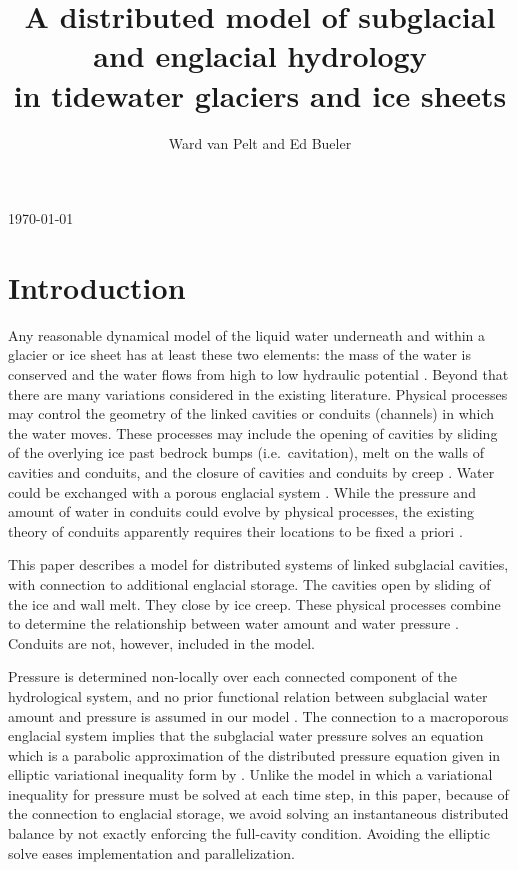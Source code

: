 \documentclass[11pt,final]{amsart}%
\title[]{A distributed model of subglacial and englacial hydrology \\ in tidewater glaciers and ice sheets}
\author[]{Ward van Pelt and Ed Bueler}
\begin{document}
\graphicspath{{figs/}}

\scriptsize \hfill \today \normalsize
\vspace{0.5in}

\maketitle
\thispagestyle{empty}

\section{Introduction}

Any reasonable dynamical model of the liquid water underneath and within a glacier or ice sheet has at least these two elements: the mass of the water is conserved and the water flows from high to low hydraulic potential \citep{Clarke05}.  Beyond that there are many variations considered in the existing literature.  Physical processes may control the geometry of the linked cavities \citep{Kamb1987} or conduits (channels) \citep{Nye1976} in which the water moves.  These processes may include the opening of cavities by sliding of the overlying ice past bedrock bumps (i.e.~cavitation), melt on the walls of cavities and conduits, and the closure of cavities and conduits by creep \citep{Hewitt2011}.  Water could be exchanged with a porous englacial system \citep{Bartholomausetal2011}.  While the pressure and amount of water in conduits could evolve by physical processes, the existing theory of conduits apparently requires their locations to be fixed a priori \citep{PimentelFlowers2011,Schoofmeltsupply}.

This paper describes a model for distributed systems of linked subglacial cavities, with connection to additional englacial storage.  The cavities open by sliding of the ice and wall melt.  They close by ice creep.  These physical processes combine to determine the relationship between water amount and water pressure \citep{Schoofetal2012}.  Conduits are not, however, included in the model.

Pressure is determined non-locally over each connected component of the hydrological system, and no prior functional relation between subglacial water amount and pressure is assumed in our model \citep[compare][]{FlowersClarke2002_theory}.  The connection to a macroporous englacial system implies that the subglacial water pressure solves an equation which is a parabolic approximation of the distributed pressure equation given in elliptic variational inequality form by \cite{Schoofetal2012}.  Unlike the \cite{Schoofetal2012} model in which a variational inequality for pressure must be solved at each time step, in this paper, because of the connection to englacial storage, we avoid solving an instantaneous distributed balance by not exactly enforcing the full-cavity condition.  Avoiding the elliptic solve eases implementation and parallelization.
\end{document}
